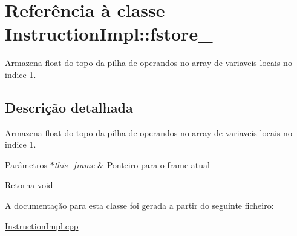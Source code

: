 \hypertarget{class_instruction_impl_1_1fstore__1}{}\section{Referência à classe Instruction\+Impl\+:\+:fstore\+\_}
\label{class_instruction_impl_1_1fstore__1}


Armazena float do topo da pilha de operandos no array de variaveis locais no indice 1.  




\subsection{Descrição detalhada}
Armazena float do topo da pilha de operandos no array de variaveis locais no indice 1. 


\begin{DoxyParams}{Parâmetros}
{\em $\ast$this\+\_\+frame} & Ponteiro para o frame atual \\
\hline
\end{DoxyParams}
\begin{DoxyReturn}{Retorna}
void 
\end{DoxyReturn}


A documentação para esta classe foi gerada a partir do seguinte ficheiro\+:\begin{DoxyCompactItemize}
\item 
\hyperlink{_instruction_impl_8cpp}{Instruction\+Impl.\+cpp}\end{DoxyCompactItemize}
